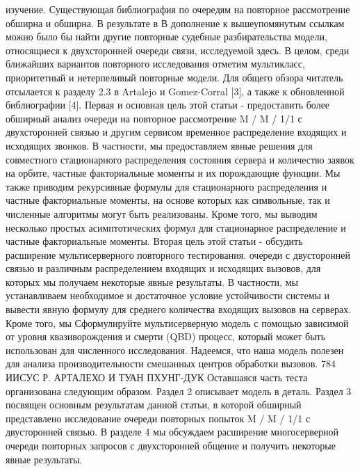 изучение.
Существующая библиография по очередям на повторное рассмотрение обширна и обширна. В результате в
В дополнение к вышеупомянутым ссылкам можно было бы найти другие повторные судебные разбирательства
модели, относящиеся к двухсторонней очереди связи, исследуемой здесь. В целом,
среди ближайших вариантов повторного исследования отметим мультикласс, приоритетный и нетерпеливый
повторные модели. Для общего обзора читатель отсылается к разделу 2.3 в
Artalejo и Gomez-Corral [3], а также к обновленной библиографии [4].
Первая и основная цель этой статьи - предоставить более обширный анализ
очереди на повторное рассмотрение M / M / 1/1 с двухсторонней связью и другим сервисом
временное распределение входящих и исходящих звонков. В частности, мы предоставляем явные
решения для совместного стационарного распределения состояния сервера и
количество заявок на орбите, частные факториальные моменты и их порождающие
функции. Мы также приводим рекурсивные формулы для стационарного распределения и
частные факториальные моменты, на основе которых как символьные, так и численные алгоритмы
могут быть реализованы. Кроме того, мы выводим несколько простых асимптотических формул для
стационарное распределение и частные факториальные моменты.
Вторая цель этой статьи - обсудить расширение мультисерверного повторного тестирования.
очереди с двусторонней связью и различным распределением входящих и исходящих вызовов, для которых мы получаем некоторые явные результаты. В частности, мы устанавливаем
необходимое и достаточное условие устойчивости системы и вывести явную формулу для среднего количества входящих вызовов на серверах. Кроме того, мы
Сформулируйте мультисерверную модель с помощью зависимой от уровня квазиворождения и смерти (QBD)
процесс, который может быть использован для численного исследования. Надеемся, что наша модель
полезен для анализа производительности смешанных центров обработки вызовов.
784 ИИСУС Р. АРТАЛЕХО И ТУАН ПХУНГ-ДУК
Оставшаяся часть теста организована следующим образом. Раздел 2 описывает модель в
деталь. Раздел 3 посвящен основным результатам данной статьи, в которой обширный
представлено исследование очереди повторных попыток M / M / 1/1 с двусторонней связью.
В разделе 4 мы обсуждаем расширение многосерверной очереди повторных запросов с двухсторонней
общение и получить некоторые явные результаты. 



